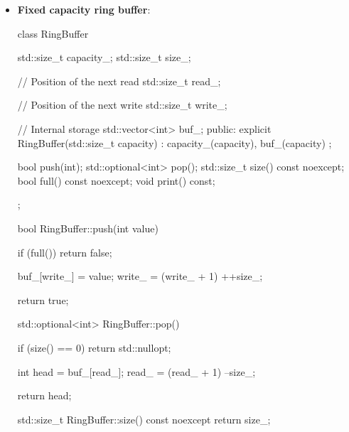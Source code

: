 \documentclass{report}
\begin{document}
    \pagebreak 
    \begin{itemize}
        \item \textbf{Fixed capacity ring buffer}: 
            \bigbreak \noindent 
            \begin{cppcode}
                class RingBuffer {
                    std::size_t capacity_{};
                    std::size_t size_{};

                    // Position of the next read
                    std::size_t read_{};

                    // Position of the next write
                    std::size_t write_{};

                    // Internal storage
                    std::vector<int> buf_{};
                public:
                    explicit RingBuffer(std::size_t capacity) : capacity_(capacity), buf_(capacity) {}; 

                    bool push(int);
                    std::optional<int> pop();
                    std::size_t size() const noexcept;
                    bool full() const noexcept;
                    void print() const;
                };
            \end{cppcode}
            \bigbreak \noindent 
            \begin{cppcode}
                bool RingBuffer::push(int value) {
                    if (full()) return false;

                    buf_[write_] = value;
                    write_ = (write_ + 1) %
                    ++size_;

                    return true;
                }
            \end{cppcode}
            \bigbreak \noindent 
            \begin{cppcode}
                std::optional<int> RingBuffer::pop() {
                    if (size() == 0) return std::nullopt;

                    int head = buf_[read_];
                    read_ = (read_ + 1) %
                    --size_;

                    return head;
                }
            \end{cppcode}
            \bigbreak \noindent 
            \begin{cppcode}
                std::size_t RingBuffer::size() const noexcept {
                    return size_;
                }


\end{cppcode}
\end{itemize}
\end{document}
